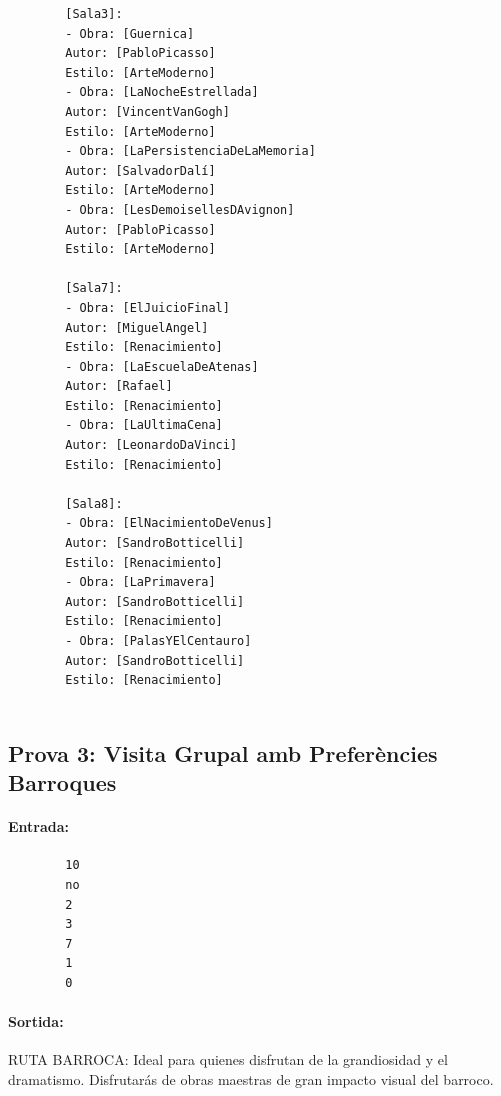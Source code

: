 \documentclass[a4paper]{article}
\begin{document}
\begin{verbatim}
		[Sala3]:
		- Obra: [Guernica]
		Autor: [PabloPicasso]
		Estilo: [ArteModerno]
		- Obra: [LaNocheEstrellada]
		Autor: [VincentVanGogh]
		Estilo: [ArteModerno]
		- Obra: [LaPersistenciaDeLaMemoria]
		Autor: [SalvadorDalí]
		Estilo: [ArteModerno]
		- Obra: [LesDemoisellesDAvignon]
		Autor: [PabloPicasso]
		Estilo: [ArteModerno]
		
		[Sala7]:
		- Obra: [ElJuicioFinal]
		Autor: [MiguelAngel]
		Estilo: [Renacimiento]
		- Obra: [LaEscuelaDeAtenas]
		Autor: [Rafael]
		Estilo: [Renacimiento]
		- Obra: [LaUltimaCena]
		Autor: [LeonardoDaVinci]
		Estilo: [Renacimiento]
		
		[Sala8]:
		- Obra: [ElNacimientoDeVenus]
		Autor: [SandroBotticelli]
		Estilo: [Renacimiento]
		- Obra: [LaPrimavera]
		Autor: [SandroBotticelli]
		Estilo: [Renacimiento]
		- Obra: [PalasYElCentauro]
		Autor: [SandroBotticelli]
		Estilo: [Renacimiento]
		
	\end{verbatim}
	
	\subsection{Prova 3: Visita Grupal amb Preferències Barroques}
	\paragraph{Entrada:}
	\begin{verbatim}
		10
		no
		2
		3
		7
		1
		0
	\end{verbatim}

	\paragraph{Sortida:\\}
		
		RUTA BARROCA: Ideal para quienes disfrutan de la grandiosidad y el dramatismo. Disfrutarás de obras maestras de gran impacto visual del barroco.
		
\end{document}

